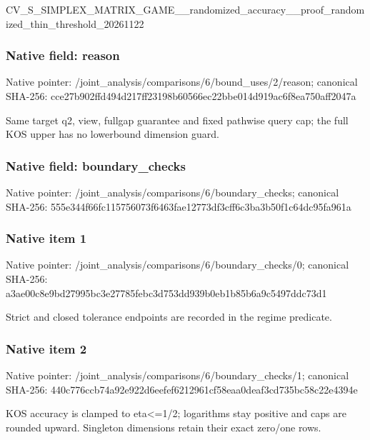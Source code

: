 \documentclass[10pt,a4paper]{article}
\begin{document}
CV\_S\_SIMPLEX\_MATRIX\_GAME\allowbreak{}\_\_randomized\_accuracy\_\_p\allowbreak{}roof\_randomized\_thin\_thr\allowbreak{}eshold\_20261122


\subsubsection{Native field: reason}


Native pointer: /joint\_analysis/comparis\allowbreak{}ons/6/bound\_uses/2/reaso\allowbreak{}n; canonical SHA-256: cce27b902ffd494d217ff231\allowbreak{}98b60566ec22bbe014d919ac\allowbreak{}6f8ea750aff2047a


Same target q2, view, fullgap guarantee and fixed pathwise query cap; the full KOS upper has no lowerbound dimension guard.


\subsubsection{Native field: boundary\_checks}


Native pointer: /joint\_analysis/comparis\allowbreak{}ons/6/boundary\_checks; canonical SHA-256: 555e344f66fc115756073f64\allowbreak{}63fae12773df3cff6c3ba3b5\allowbreak{}0f1c64dc95fa961a



\subsubsection{Native item 1}


Native pointer: /joint\_analysis/comparis\allowbreak{}ons/6/boundary\_checks/0; canonical SHA-256: a3ae00c8e9bd27995bc3e277\allowbreak{}85febc3d753dd939b0eb1b85\allowbreak{}b6a9c5497ddc73d1


Strict and closed tolerance endpoints are recorded in the regime predicate.


\subsubsection{Native item 2}


Native pointer: /joint\_analysis/comparis\allowbreak{}ons/6/boundary\_checks/1; canonical SHA-256: 440c776ccb74a92e922d6eef\allowbreak{}ef6212961cf58eaa0deaf3cd\allowbreak{}735bc58c22e4394e


KOS accuracy is clamped to eta<=1/2; logarithms stay positive and caps are rounded upward. Singleton dimensions retain their exact zero/one rows.
\end{document}
